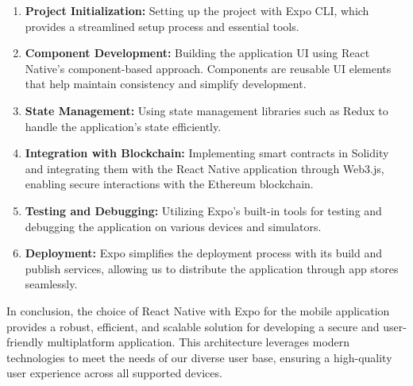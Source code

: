 \begin{enumerate}
    \item \textbf{Project Initialization:} Setting up the project with Expo CLI, which provides a streamlined setup process and essential tools.
    \item \textbf{Component Development:} Building the application UI using React Native’s component-based approach. Components are reusable UI elements that help maintain consistency and simplify development.
    \item \textbf{State Management:} Using state management libraries such as Redux to handle the application’s state efficiently.
    \item \textbf{Integration with Blockchain:} Implementing smart contracts in Solidity and integrating them with the React Native application through Web3.js, enabling secure interactions with the Ethereum blockchain.
    \item \textbf{Testing and Debugging:} Utilizing Expo’s built-in tools for testing and debugging the application on various devices and simulators.
    \item \textbf{Deployment:} Expo simplifies the deployment process with its build and publish services, allowing us to distribute the application through app stores seamlessly.
\end{enumerate}

In conclusion, the choice of React Native with Expo for the mobile application provides a robust, efficient, and scalable solution for developing a secure and user-friendly multiplatform application. This architecture leverages modern technologies to meet the needs of our diverse user base, ensuring a high-quality user experience across all supported devices.